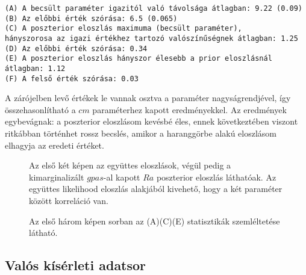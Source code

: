 \begin{verbatim}
(A) A becsült paraméter igazitól való távolsága átlagban: 9.22 (0.09)
(B) Az előbbi érték szórása: 6.5 (0.065)
(C) A poszterior eloszlás maximuma (becsült paraméter), 
hányszorosa az igazi értékhez tartozó valószínűségnek átlagban: 1.25
(D) Az előbbi érték szórása: 0.34
(E) A poszterior eloszlás hányszor élesebb a prior eloszlásnál átlagban: 1.12
(F) A felső érték szórása: 0.03
\end{verbatim}

A zárójelben levő értékek le vannak osztva a paraméter nagyságrendjével, így összehasonlítható a $cm$ paraméterhez kapott eredményekkel. Az eredmények egybevágnak: a poszterior eloszlásom kevésbé éles, ennek következtében viszont ritkábban történhet rossz becslés, amikor a haranggörbe alakú eloszlásom elhagyja az eredeti értéket.

\begin{figure}
	\hfill
	\hfill
	\hfill
	\vfill
	\caption[Kétkompartmentum, színes zaj, két paraméter inferencia]{Az első két képen az együttes eloszlások, végül pedig a kimarginalizált $gpas$-al kapott $Ra$ poszterior eloszlás láthatóak. Az együttes likelihood eloszlás alakjából kivehető, hogy a két paraméter között korreláció van.}%
	\label{fig:cn2}
\end{figure}

\begin{figure}
	\hfill
	\hfill
	\hfill
	\vfill
	\caption[Kétkompartmentumos, színes zaj, két paraméter statisztika]{Az első három képen sorban az (A)(C)(E) statisztikák szemléltetése látható.}%
	\label{fig:cn2-stat}
\end{figure}












\FloatBarrier
\subsection{Valós kísérleti adatsor}
